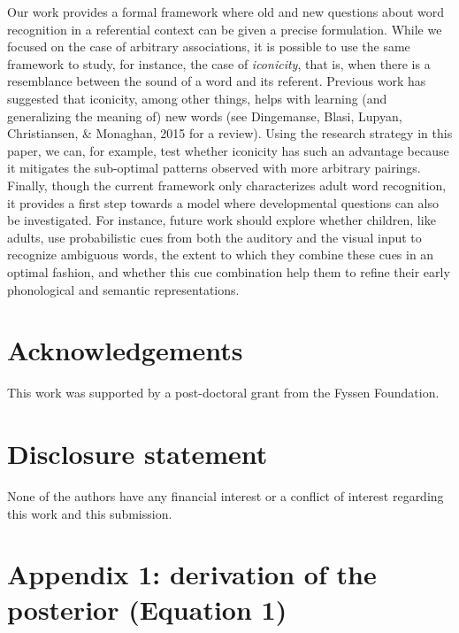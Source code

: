 \documentclass[english,,man,floatsintext]{apa6}
\theoremstyle{definition}
\theoremstyle{definition}
\theoremstyle{definition}
\theoremstyle{remark}
\begin{document}
Our work provides a formal framework where old and new questions about
word recognition in a referential context can be given a precise
formulation. While we focused on the case of arbitrary associations, it
is possible to use the same framework to study, for instance, the case
of \textit{iconicity}, that is, when there is a resemblance between the
sound of a word and its referent. Previous work has suggested that
iconicity, among other things, helps with learning (and generalizing the
meaning of) new words (see Dingemanse, Blasi, Lupyan, Christiansen, \&
Monaghan, 2015 for a review). Using the research strategy in this paper,
we can, for example, test whether iconicity has such an advantage
because it mitigates the sub-optimal patterns observed with more
arbitrary pairings. Finally, though the current framework only
characterizes adult word recognition, it provides a first step towards a
model where developmental questions can also be investigated. For
instance, future work should explore whether children, like adults, use
probabilistic cues from both the auditory and the visual input to
recognize ambiguous words, the extent to which they combine these cues
in an optimal fashion, and whether this cue combination help them to
refine their early phonological and semantic representations.

\vspace{1em}

\vspace{1em}

\section{Acknowledgements}\label{acknowledgements}

This work was supported by a post-doctoral grant from the Fyssen
Foundation.

\section{Disclosure statement}\label{disclosure-statement}

None of the authors have any financial interest or a conflict of
interest regarding this work and this submission.

\section{Appendix 1: derivation of the posterior (Equation
1)}\label{appendix-1-derivation-of-the-posterior-equation-1}
\end{document}
